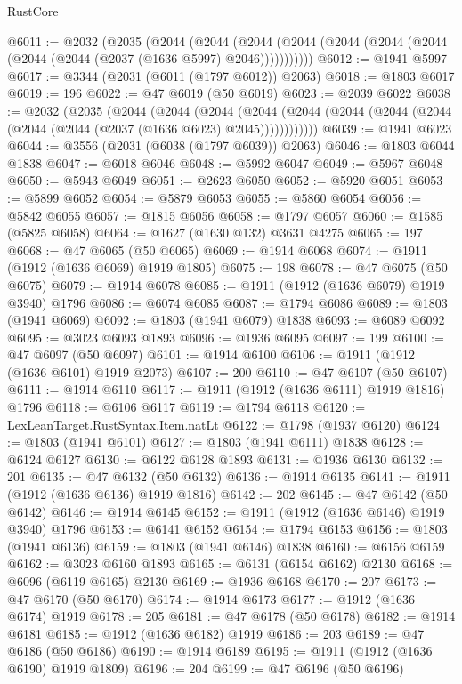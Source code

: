 \begin{lexlean}{RustCore}
\begin{coremodule}
@6011 := @2032
    (@2035
      (@2044
        (@2044
          (@2044 (@2044 (@2044 (@2044 (@2044 (@2044 (@2044 (@2037 (@1636 @5997) @2046)))))))))))
@6012 := @1941 @5997
@6017 := @3344 (@2031 (@6011 (@1797 @6012)) @2063)
@6018 := @1803 @6017
@6019 := 196
@6022 := @47 @6019 (@50 @6019)
@6023 := @2039 @6022
@6038 := @2032
    (@2035
      (@2044
        (@2044
          (@2044
            (@2044 (@2044 (@2044 (@2044 (@2044 (@2044 (@2044 (@2037 (@1636 @6023) @2045))))))))))))
@6039 := @1941 @6023
@6044 := @3556 (@2031 (@6038 (@1797 @6039)) @2063)
@6046 := @1803 @6044 @1838
@6047 := @6018 @6046
@6048 := @5992 @6047
@6049 := @5967 @6048
@6050 := @5943 @6049
@6051 := @2623 @6050
@6052 := @5920 @6051
@6053 := @5899 @6052
@6054 := @5879 @6053
@6055 := @5860 @6054
@6056 := @5842 @6055
@6057 := @1815 @6056
@6058 := @1797 @6057
@6060 := @1585 (@5825 @6058)
@6064 := @1627 (@1630 @132) @3631 @4275
@6065 := 197
@6068 := @47 @6065 (@50 @6065)
@6069 := @1914 @6068
@6074 := @1911 (@1912 (@1636 @6069) @1919 @1805)
@6075 := 198
@6078 := @47 @6075 (@50 @6075)
@6079 := @1914 @6078
@6085 := @1911 (@1912 (@1636 @6079) @1919 @3940) @1796
@6086 := @6074 @6085
@6087 := @1794 @6086
@6089 := @1803 (@1941 @6069)
@6092 := @1803 (@1941 @6079) @1838
@6093 := @6089 @6092
@6095 := @3023 @6093 @1893
@6096 := @1936 @6095
@6097 := 199
@6100 := @47 @6097 (@50 @6097)
@6101 := @1914 @6100
@6106 := @1911 (@1912 (@1636 @6101) @1919 @2073)
@6107 := 200
@6110 := @47 @6107 (@50 @6107)
@6111 := @1914 @6110
@6117 := @1911 (@1912 (@1636 @6111) @1919 @1816) @1796
@6118 := @6106 @6117
@6119 := @1794 @6118
@6120 := LexLeanTarget.RustSyntax.Item.natLt
@6122 := @1798 (@1937 @6120)
@6124 := @1803 (@1941 @6101)
@6127 := @1803 (@1941 @6111) @1838
@6128 := @6124 @6127
@6130 := @6122 @6128 @1893
@6131 := @1936 @6130
@6132 := 201
@6135 := @47 @6132 (@50 @6132)
@6136 := @1914 @6135
@6141 := @1911 (@1912 (@1636 @6136) @1919 @1816)
@6142 := 202
@6145 := @47 @6142 (@50 @6142)
@6146 := @1914 @6145
@6152 := @1911 (@1912 (@1636 @6146) @1919 @3940) @1796
@6153 := @6141 @6152
@6154 := @1794 @6153
@6156 := @1803 (@1941 @6136)
@6159 := @1803 (@1941 @6146) @1838
@6160 := @6156 @6159
@6162 := @3023 @6160 @1893
@6165 := @6131 (@6154 @6162) @2130
@6168 := @6096 (@6119 @6165) @2130
@6169 := @1936 @6168
@6170 := 207
@6173 := @47 @6170 (@50 @6170)
@6174 := @1914 @6173
@6177 := @1912 (@1636 @6174) @1919
@6178 := 205
@6181 := @47 @6178 (@50 @6178)
@6182 := @1914 @6181
@6185 := @1912 (@1636 @6182) @1919
@6186 := 203
@6189 := @47 @6186 (@50 @6186)
@6190 := @1914 @6189
@6195 := @1911 (@1912 (@1636 @6190) @1919 @1809)
@6196 := 204
@6199 := @47 @6196 (@50 @6196)

\end{coremodule}
\end{lexlean}
